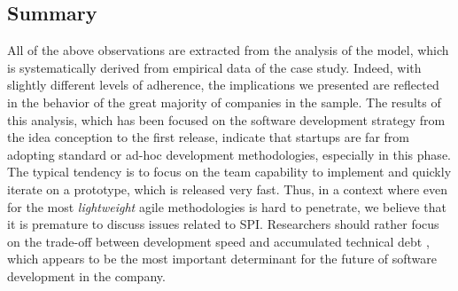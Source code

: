 \documentclass[10pt,journal,letterpaper,compsoc]{IEEEtran}
\begin{document}
\subsection{Summary}
All of the above observations are extracted from the analysis of the model, 
which is systematically derived from empirical data of the case study. Indeed, 
with slightly different levels of adherence, the implications we presented are 
reflected in the behavior of the great majority of companies in the sample. The 
results of this analysis, which has been focused on the software development 
strategy from the idea conception to the first release, indicate that startups 
are far from adopting standard or ad-hoc development methodologies, especially 
in this phase. The typical tendency is to focus on the team capability to 
implement and quickly iterate on a prototype, which is released very fast. Thus, 
in a context where even for the most \textit{lightweight} agile methodologies is 
hard to penetrate, we believe that it is premature to discuss issues related to 
SPI. Researchers should rather focus on the trade-off between development speed 
and accumulated technical debt \cite{Brown:2010:MTD:1882362.1882373}, which 
appears to be the most important determinant for the future of 
software development in the company.



\end{document}
